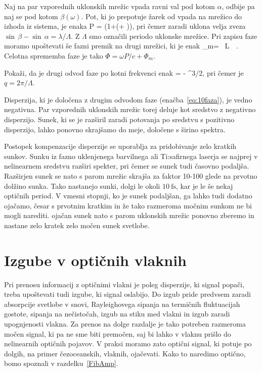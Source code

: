 Naj na par vzporednih uklonskih mrežic vpada ravni val pod kotom $\alpha$, odbije
pa naj se pod kotom $\beta(\omega)$. Pot, ki jo prepotuje žarek od vpada na mrežico 
do izhoda iz sistema, je enaka 
\beq
P =  \left(1+\cos(\alpha + \beta)\right),
\eeq
pri čemer zaradi uklona velja zveza $\sin\,\beta - \sin\,\alpha = \lambda/\Lambda$.
Z $\Lambda$ smo označili periodo uklonske mrežice. 
Pri zapisu faze moramo upoštevati še fazni premik na drugi mrežici, ki je enak
\beq
\Phi_m=\frac{2\pi}{\Lambda} \, L \, \tan\,\beta.
\eeq
Celotna sprememba faze je tako $\Phi = \omega P/c + \Phi_m$.

\begin{definition}
Pokaži, da je drugi odvod faze po kotni frekvenci enak
\beq
{} = - 
{^{3/2}},
\label{eq:10faza}
\eeq
pri čemer je $q = 2 \pi/\Lambda$.
\end{definition}
Disperzija, ki je določena z drugim odvodom faze (enačba~\ref{eq:10faza}),
je vedno negativna. Par vzporednih uklonskih mrežic torej deluje kot sredstvo
z negativno disperzijo. Sunek, ki se je razširil zaradi potovanja
po sredstvu s pozitivno disperzijo, lahko ponovno skrajšamo do meje,
določene s širino spektra. 

\begin{remark}
Postopek kompenzacije disperzije se uporablja za pridobivanje zelo 
kratkih sunkov. Sunku iz fazno uklenjenega barvilnega ali Ti:safirnega
laserja se najprej v nelinearnem sredstvu razširi spekter, pri čemer
se sunek tudi časovno podaljša. Razširjen sunek se nato s parom mrežic skrajša
za faktor 10-100 glede na prvotno dolžino sunka. Tako nastanejo sunki,
dolgi le okoli $10~\si{\femto\second}$, kar je le še nekaj optičnih period. 
V vmesni stopnji, ko je sunek podaljšan, ga lahko tudi dodatno ojačamo, česar
s prvotnim kratkim in že tako razmeroma močnim sunkom ne bi mogli narediti. ojačan
sunek nato s parom uklonskih mrežic ponovno zberemo in nastane zelo kratek
zelo močen sunek svetlobe.
\end{remark}


\section{Izgube v optičnih vlaknih}
Pri prenosu informacij z optičnimi vlakni je poleg disperzije, ki signal popači,
treba upoštevati tudi izgube, ki signal oslabijo. 
Do izgub pride predvsem zaradi absorpcije svetlobe v snovi,
Rayleighovega sipanja na termičnih fluktuacijah gostote, sipanja na nečistočah, 
izgub na stiku med vlakni in izgub zaradi upognjenosti vlakna. Za prenos na dolge
razdalje je tako potreben razmeroma močen signal, ki pa ne sme biti premočen,
saj bi lahko v vlaknu prišlo do nelinearnih optičnih pojavov. V praksi moramo zato 
optični signal, ki potuje po dolgih, na primer čezoceanskih, vlaknih, ojačevati. 
Kako to naredimo optično, bomo spoznali v razdelku~\ref{FibAmp}.

